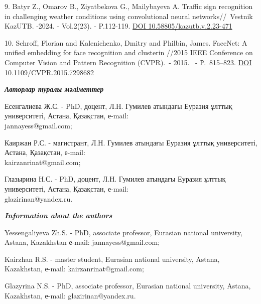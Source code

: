 \begin{references}
9. Batyr Z., Omarov B., Ziyatbekova G., Mailybayeva A. Traffic sign
recognition in challenging weather conditions using convolutional neural
networks//~Vestnik KazUTB. -2024. - Vol.2(23). - P.112-119.
\href{https://doi.org/10.58805/kazutb.v.2.23-471}{DOI
10.58805/kazutb.v.2.23-471}

10. Schroff, Florian and Kalenichenko, Dmitry and Philbin, James.
FaceNet: A unified embedding for face recognition and clusterin //2015
IEEE Conference on Computer Vision and Pattern Recognition (CVPR).~-
2015. ~- Р.~815--823.
\href{https://doi.org/10.1109/CVPR.2015.7298682}{DOI
10.1109/CVPR.2015.7298682}
\end{references}

\begin{authorinfo}
\hspace{1em}\emph{{\bfseries Авторлар туралы мәліметтер}}

Есенгалиева Ж.С. - PhD, доцент, Л.Н. Гумилев атындағы Еуразия ұлттық
университеті, Астана, Қазақстан, е-mail: \\jannayess@gmail.com;

Каиржан Р.С. - магистрант, Л.Н. Гумилев атындағы Еуразия ұлттық
университеті, Астана, Қазақстан, е-mail: \\kairzanrinat@gmail.com;

Глазырина Н.С. - PhD, доцент, Л.Н. Гумилев атындағы Еуразия ұлттық
университеті, Астана, Қазақстан, е-mail: \\glazirinan@yandex.ru.

\hspace{1em}\emph{{\bfseries Information about the authors}}

Yessengaliyeva Zh.S. - PhD, associate professor, Eurasian national
university, Astana, Kazakhstan е-mail: jannayess@gmail.com;

Kairzhan R.S. - master student, Eurasian national university, Astana,
Kazakhstan, е-mail: kairzanrinat@gmail.com;

Glazyrina N.S. - PhD, associate professor, Eurasian national university,
Astana, Kazakhstan, е-mail: glazirinan@yandex.ru.
\end{authorinfo}
